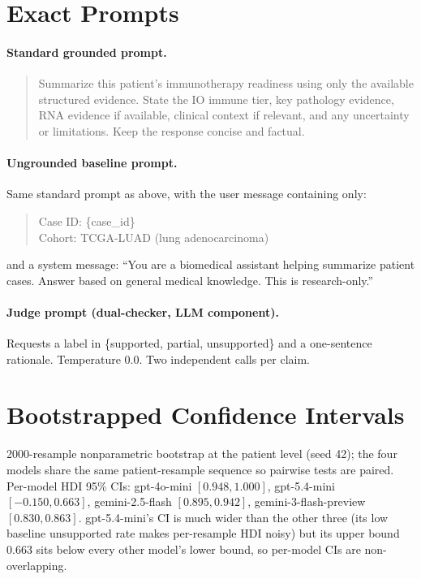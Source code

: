 \documentclass{article}
\theoremstyle{plain}
\begin{document}
\section{Exact Prompts}
\label{app:prompts}

\paragraph{Standard grounded prompt.}
\begin{quote}\small\ttfamily
Summarize this patient's immunotherapy readiness using only the available structured evidence. State the IO immune tier, key pathology evidence, RNA evidence if available, clinical context if relevant, and any uncertainty or limitations. Keep the response concise and factual.
\end{quote}

\paragraph{Ungrounded baseline prompt.}
Same standard prompt as above, with the user message containing only:
\begin{quote}\small\ttfamily
Case ID: \{case\_id\}\\
Cohort: TCGA-LUAD (lung adenocarcinoma)
\end{quote}
and a system message: ``You are a biomedical assistant helping summarize patient cases. Answer based on general medical knowledge. This is research-only.''

\paragraph{Judge prompt (dual-checker, LLM component).}
Requests a label in \{supported, partial, unsupported\} and a one-sentence rationale. Temperature 0.0. Two independent calls per claim.

\section{Bootstrapped Confidence Intervals}
\label{app:bootstrap}

2000-resample nonparametric bootstrap at the patient level (seed 42); the four models share the same patient-resample sequence so pairwise tests are paired. Per-model HDI 95\% CIs: gpt-4o-mini $[0.948, 1.000]$, gpt-5.4-mini $[-0.150, 0.663]$, gemini-2.5-flash $[0.895, 0.942]$, gemini-3-flash-preview $[0.830, 0.863]$. gpt-5.4-mini's CI is much wider than the other three (its low baseline unsupported rate makes per-resample HDI noisy) but its upper bound 0.663 sits below every other model's lower bound, so per-model CIs are non-overlapping.
\end{document}
